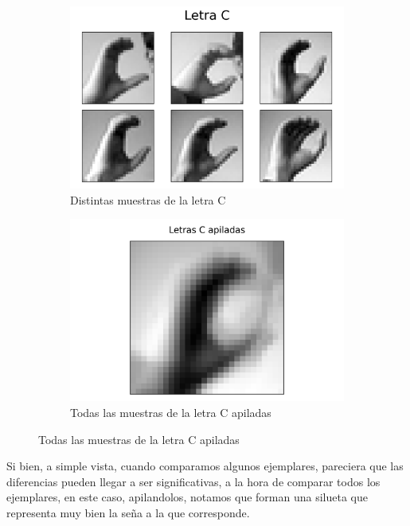 \documentclass[10pt,a4paper]{article}
\begin{document}
\begin{figure}[ht!]
	\begin{subfigure}{0.5\textwidth}
		\centering
		\includegraphics[width=1\linewidth]{Imagenes/letra_C.png} 
		\caption{Distintas muestras de la letra C}
		\label{fig:subfig1}
	\end{subfigure}
	\begin{subfigure}{0.55\textwidth}
		\includegraphics[width=1\linewidth]{Imagenes/letra_C_apilada.png}
		\caption{Todas las muestras de la letra C apiladas}
		\label{fig:subfig2}
	\end{subfigure}
	\label{fig:subfigs}
\end{figure}

\newpage

Si bien, a simple vista, cuando comparamos algunos ejemplares, pareciera que las diferencias pueden llegar a ser significativas, a la hora de comparar todos los ejemplares, en este caso, apilandolos, notamos que forman una silueta que representa muy bien la seña a la que corresponde. \vspace{0.1cm}
\end{document}
